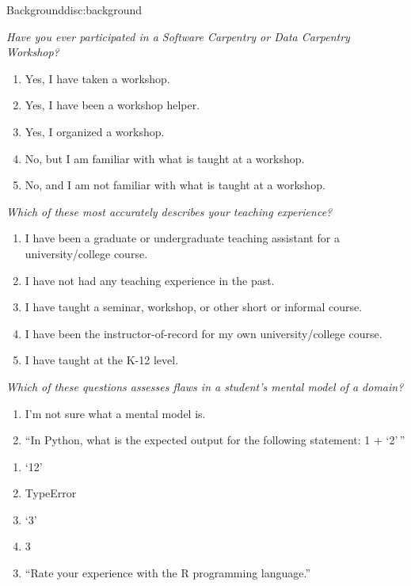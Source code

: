 \begin{discussion}{Background}{disc:background}

\emph{Have you ever participated in a Software Carpentry or Data
Carpentry Workshop?}

\begin{enumerate}
\item
  Yes, I have taken a workshop.
\item
  Yes, I have been a workshop helper.
\item
  Yes, I organized a workshop.
\item
  No, but I am familiar with what is taught at a workshop.
\item
  No, and I am not familiar with what is taught at a workshop.
\end{enumerate}

\emph{Which of these most accurately describes your teaching
experience?}

\begin{enumerate}
\item
  I have been a graduate or undergraduate teaching assistant for a
  university/college course.
\item
  I have not had any teaching experience in the past.
\item
  I have taught a seminar, workshop, or other short or informal course.
\item
  I have been the instructor-of-record for my own university/college
  course.
\item
  I have taught at the K-12 level.
\end{enumerate}

\emph{Which of these questions assesses flaws in a student's mental
model of a domain?}

\begin{enumerate}
\item
  I'm not sure what a mental model is.
\item
  ``In Python, what is the expected output for the following statement:
  1 + `2'\,''
\end{enumerate}

\begin{enumerate}
\item
  `12'
\item
  TypeError
\item
  `3'
\item
  3
\end{enumerate}

\begin{enumerate}
\setcounter{enumi}{2}
\item
  ``Rate your experience with the R programming language.''
\end{enumerate}


\end{discussion}
